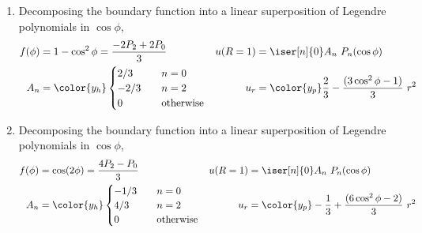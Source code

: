 \begin{enumerate}
    \item Decomposing the boundary function into a linear superposition of
          Legendre polynomials in $ \cos\phi $,
          \begin{align}
              f(\phi) & = 1 - \cos^2\phi = \frac{-2P_2 + 2P_0}{3}                    &
              u(R=1)  & = \iser[n]{0} A_n\ P_n(\cos\phi)                               \\
              A_n     & = \color{y_h} \begin{cases}
                                          2/3  & \quad n = 0            \\
                                          -2/3 & \quad n = 2            \\
                                          0    & \quad \text{otherwise}
                                      \end{cases}                             &
              u_r     & = \color{y_p} \frac{2}{3} - \frac{(3\cos^2\phi - 1)}{3}\ r^2
          \end{align}

    \item Decomposing the boundary function into a linear superposition of
          Legendre polynomials in $ \cos\phi $,
          \begin{align}
              f(\phi) & = \cos(2\phi) = \frac{4P_2 - P_0}{3} &
              u(R=1)  & = \iser[n]{0} A_n\ P_n(\cos\phi)            \\
              A_n     & = \color{y_h} \begin{cases}
                                          -1/3 & \quad n = 0            \\
                                          4/3  & \quad n = 2            \\
                                          0    & \quad \text{otherwise}
                                      \end{cases}     &
              u_r     & = \color{y_p} -\frac{1}{3}
              + \frac{(6\cos^2\phi - 2)}{3}\ r^2
          \end{align}


\end{enumerate}
